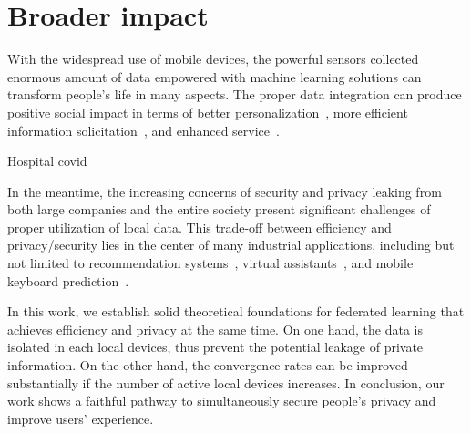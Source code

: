 
\section{Broader impact}
With the widespread use of mobile devices, the powerful sensors
collected enormous amount of data empowered with machine learning
solutions can transform people's life in many aspects. The proper
data integration can produce positive social
impact in terms of better personalization~\cite{fallah2020personalized}, more efficient information solicitation~\cite{chen2018federated}, and enhanced service~\cite{47586}.

Hospital covid

In the meantime, the increasing concerns of security and
privacy leaking from both large companies and the entire society
present significant challenges of proper utilization of local
data. This trade-off between efficiency and privacy/security
lies in the center of many industrial applications, including 
but not limited to recommendation systems~\cite{chen2018federated}, virtual assistants~\cite{lamautonomy}, and mobile keyboard prediction~\cite{47586}.

In this work, we establish solid theoretical foundations for federated
learning that achieves efficiency and privacy at the same time. 
On one hand, the data is isolated in each local devices, thus prevent
the potential leakage of private information. On the other hand, the
convergence rates can be improved substantially if the number of
active local devices increases. In conclusion, our work 
shows a faithful pathway to simultaneously secure people's privacy and improve
users' experience.




